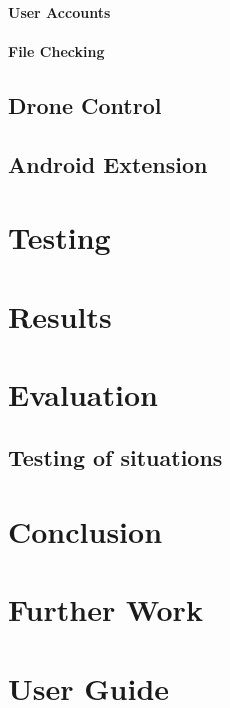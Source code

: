 \documentclass{article}
\begin{document}
\paragraph{User Accounts}
\paragraph{File Checking}

\subsection{Drone Control}

\subsection{Android Extension}

\section{Testing}



\section{Results}




\section{Evaluation}
\subsection{Testing of situations}






\section{Conclusion}
\section{Further Work}
\section{User Guide}
\end{document}
